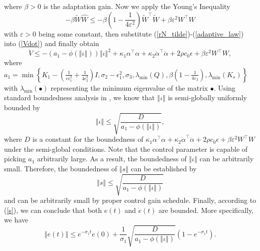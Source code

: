 \documentclass{article}
\begin{document}
	where $\beta>0$ is the adaptation gain. Now we apply the Young's Inequality
	\begin{equation}
	-\beta\tilde{W}\hat{W}\leq -\beta\left(1-\frac{1}{4\varepsilon^2}\right)\tilde{W}^{\top}\tilde{W} + \beta\varepsilon^{2}W^{\top}W
	\end{equation}
	with $\varepsilon>0$ being some constant, then substitute (\ref{rN_tilde})-(\ref{adaptive_law}) into (\ref{Vdot}) and finally obtain
	\begin{equation}
	\dot{V}\leq -\left(a_{1} - \phi\left(\left\Vert \iota\right\Vert\right)\right)\left\Vert \iota\right\Vert^{2} + \kappa_{1}\alpha^{\top}\alpha + \kappa_{2}\dot{\alpha}^{\top}\dot{\alpha} + 2\rho c_{0}\epsilon + \beta\varepsilon^{2}W^{\top}W, \label{Vdot2}
	\end{equation}
	where $a_{1}=\min\left\{K_{1}-\left(\frac{1}{e\epsilon_{1}^{2}}+\frac{1}{4\epsilon_{2}^{2}}\right)I, \sigma_{2}-\epsilon_{1}^{2},\sigma_{3},\lambda_{\min}\left(Q\right), \beta\left(1-\frac{1}{4\varepsilon_{2}}\right),\lambda_{\min}\left(K_{s}\right)\right\}$ with $\lambda_{\min}\left(\bullet\right)$ representing the minimum eigenvalue of the matrix $\bullet$. Using standard boundedness analysis in \cite{Swar:00}, we know that $\left\Vert\iota\right\Vert$ is semi-globally uniformly bounded by
	\begin{equation}
	\left\Vert\iota\right\Vert \leq \sqrt{\frac{D}{a_{1} - \phi\left(\left\Vert \iota\right\Vert\right)}}, \label{bound}
	\end{equation}  
	where $D$ is a constant for the boundedness of $\kappa_{1}\alpha^{\top}\alpha + \kappa_{2}\dot{\alpha}^{\top}\dot{\alpha} + 2\rho c_{0}\epsilon + \beta\varepsilon^{2}W^{\top}W$ under the semi-global conditions. Note that the control parameter is capable of picking $a_{1}$ arbitrarily large. As a result, the boundedness of $\left\Vert\iota\right\Vert$ can be arbitrarily small. Therefore, the boundedness of $\left\Vert s\right\Vert$ can be established by
	\begin{equation}
	\left\Vert s\right\Vert \leq \sqrt{\frac{D}{a_{1} - \phi\left(\left\Vert \iota\right\Vert\right)}}
	\end{equation}
	and can be arbitrarily small by proper control gain schedule. Finally, according to (\ref{s}), we can conclude that both $e(t)$ and $\dot{e}(t)$ are bounded. More specifically, we have
	\begin{equation}
	\left\Vert e(t)\right\Vert \leq e^{-\sigma_{1}t}e(0) + \frac{1}{\sigma_{1}}\sqrt{\frac{D}{a_{1} - \phi\left(\left\Vert \iota\right\Vert\right)}}\left(1-e^{-\sigma_{1}t}\right).
	\end{equation}
	
	
	
	
	
	
	
	
	
\end{document}
